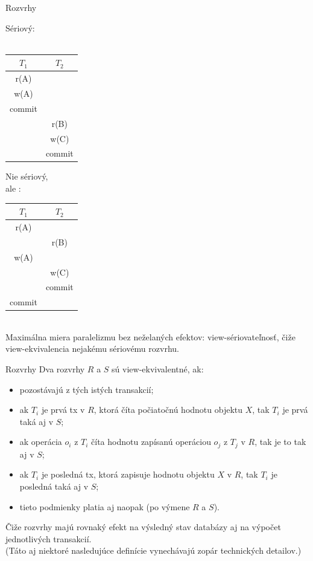 \documentclass[12pt]{beamer}
\begin{document}
\begin{frame}[fragile]{Rozvrhy}
\begin{minipage}{.4\pdfpagewidth}
\alert{Sériový}:\\
\\[5mm]
\begin{tabular}{c|c}
  $T_1$  & $T_2$  \\\hline\hline
  r(A)   &        \\\hline
  w(A)   &        \\\hline
  commit &        \\\hline
         & r(B)   \\\hline
         & w(C)   \\\hline
         & commit \\
\end{tabular}
\end{minipage}
\begin{minipage}{.4\pdfpagewidth}
Nie sériový,\\
ale :\\[5mm]
\begin{tabular}{c|c}
  $T_1$  & $T_2$  \\\hline\hline
  r(A)   &        \\\hline
         & r(B)   \\\hline
  w(A)   &        \\\hline
         & w(C)   \\\hline
         & commit \\\hline
  commit &        \\
\end{tabular}
\end{minipage}
\\[5mm]
Maximálna miera paralelizmu bez neželaných efektov: \alert{view-sériovateľnosť},
čiže \alert{view-ekvivalencia} nejakému sériovému rozvrhu.
\end{frame}


\begin{frame}[fragile]{Rozvrhy}
Dva rozvrhy $R$ a $S$ sú \alert{view-ekvivalentné}, ak:
\begin{itemize}
\item pozostávajú z tých istých transakcií;
\item ak $T_i$ je prvá tx v $R$, ktorá číta počiatočnú hodnotu objektu $X$, tak $T_i$ je prvá taká aj v $S$;
\item ak operácia $o_i$ z $T_i$ číta hodnotu zapísanú operáciou $o_j$ z $T_j$ v $R$, tak je to tak aj v $S$;
\item ak $T_i$ je posledná tx, ktorá zapisuje hodnotu objektu $X$ v $R$, tak $T_i$ je posledná taká aj v $S$;
\item tieto podmienky platia aj naopak (po výmene $R$ a $S$).
\end{itemize}
Čiže rozvrhy majú rovnaký efekt na výsledný stav databázy aj na výpočet jednotlivých transakcií.\\
\scriptsize{(Táto aj niektoré nasledujúce definície vynechávajú zopár technických detailov.)}
\end{frame}
\end{document}
